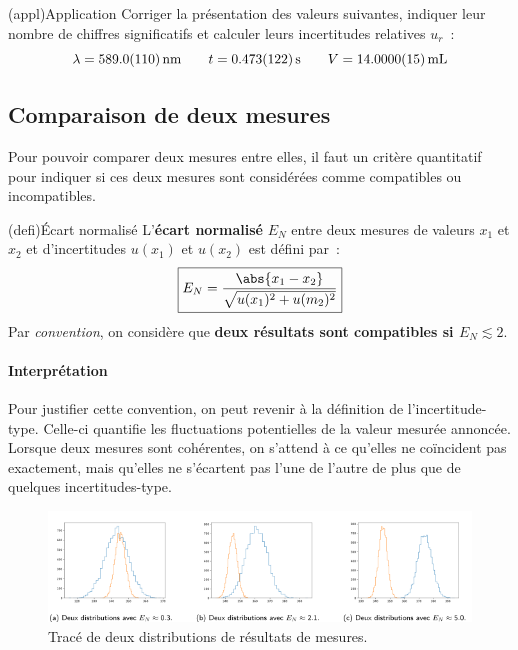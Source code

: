 \documentclass[../main/main.tex]{subfiles}
\begin{document}
\begin{tcb}(appl){Application}
	Corriger la présentation des valeurs suivantes, indiquer leur nombre de
	chiffres significatifs et calculer leurs incertitudes relatives $u_r$~:
	\[
		\lambda = \SI{589.0\pm11}{nm}
		\qquad
		t = \SI{0.473 \pm 0.122}{s}
		\qquad
		V = \SI{14 \pm 0.0015}{mL}
	\]
	\tcblower
\end{tcb}

\subsection{Comparaison de deux mesures}
Pour pouvoir comparer deux mesures entre elles, il faut un critère quantitatif
pour indiquer si ces deux mesures sont considérées comme compatibles ou
incompatibles.
\begin{tcb}(defi){Écart normalisé}
	L'\textbf{écart normalisé} $E_N$ entre deux mesures de valeurs $x_1$ et $x_2$ et d'incertitudes
	$u(x_1)$ et $u(x_2)$ est défini par~:
	\[
		\boxed{E_N = \frac{\abs{x_1-x_2}}{\sqrt{u(x_1)^{2} + u(m_2)^{2}}}}
	\]
	Par \textit{convention}, on considère que \textbf{deux résultats sont
		compatibles si $E_N \lesssim 2$}.
\end{tcb}

\paragraph*{Interprétation}
Pour justifier cette convention, on peut revenir à la définition de
l'incertitude-type. Celle-ci quantifie les fluctuations potentielles de la
valeur mesurée annoncée. Lorsque deux mesures sont cohérentes, on s'attend à ce
qu'elles ne coïncident pas exactement, mais qu'elles ne s'écartent pas l'une de
l'autre de plus que de quelques incertitudes-type.

\begin{figure}[htbp]
	\centering
	\includegraphics[scale=1]{zscore}
	\caption{Tracé de deux distributions de résultats de mesures.}
	\label{fig:zscore}
\end{figure}
\end{document}
